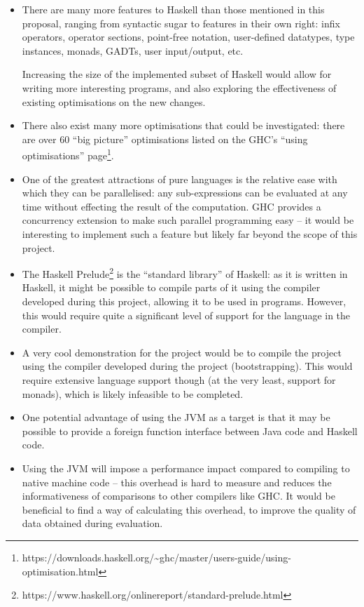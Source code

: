 \documentclass[12pt]{article}
\begin{document}
\begin{itemize}
\item
{
    There are many more features to Haskell than those mentioned in this proposal, ranging from syntactic sugar to
    features in their own right: infix operators, operator sections, point-free notation, user-defined datatypes, type
    instances, monads, GADTs, user input/output, etc.

    Increasing the size of the implemented subset of Haskell would allow for writing more interesting programs, and also
    exploring the effectiveness of existing optimisations on the new changes.
}
\item
{
    There also exist many more optimisations that could be investigated: there are over 60 ``big picture'' optimisations
    listed on the GHC's ``using optimisations''
    page\footnote{https://downloads.haskell.org/\~{}ghc/master/users-guide/using-optimisation.html}.
}
\item
{
    One of the greatest attractions of pure languages is the relative ease with which they can be parallelised: any
    sub-expressions can be evaluated at any time without effecting the result of the computation. GHC provides a
    concurrency extension to make such parallel programming easy -- it would be interesting to implement such a feature
    but likely far beyond the scope of this project.
}
\item
{
    The Haskell Prelude\footnote{https://www.haskell.org/onlinereport/standard-prelude.html} is the ``standard library''
    of Haskell: as it is written in Haskell, it might be possible to compile parts of it using the compiler developed
    during this project, allowing it to be used in programs. However, this would require quite a significant level of
    support for the language in the compiler.
}
\item
{
    A very cool demonstration for the project would be to compile the project using the compiler developed during the
    project (bootstrapping). This would require extensive language support though (at the very least, support for
    monads), which is likely infeasible to be completed.
}
\item
{
    One potential advantage of using the JVM as a target is that it may be possible to provide a foreign function
    interface between Java code and Haskell code.
}
\item
{
    Using the JVM will impose a performance impact compared to compiling to native machine code -- this overhead is hard
    to measure and reduces the informativeness of comparisons to other compilers like GHC. It would be beneficial to
    find a way of calculating this overhead, to improve the quality of data obtained during evaluation.
}
\end{itemize}
\end{document}
